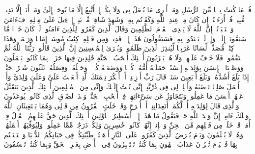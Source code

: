 \stopbuffer
\startbuffer[\q:46:9]
قُلۡ مَا كُنتُ بِدۡعࣰا مِّنَ ٱلرُّسُلِ وَمَاۤ أَدۡرِی مَا یُفۡعَلُ بِی وَلَا بِكُمۡۖ إِنۡ أَتَّبِعُ إِلَّا مَا یُوحَىٰۤ إِلَیَّ وَمَاۤ أَنَا۠ إِلَّا نَذِیرࣱ مُّبِینࣱ%
\stopbuffer
\startbuffer[\q:46:10]
قُلۡ أَرَءَیۡتُمۡ إِن كَانَ مِنۡ عِندِ ٱللَّهِ وَكَفَرۡتُم بِهِۦ وَشَهِدَ شَاهِدࣱ مِّنۢ بَنِیۤ إِسۡرَٰۤءِیلَ عَلَىٰ مِثۡلِهِۦ فَءَامَنَ وَٱسۡتَكۡبَرۡتُمۡۚ إِنَّ ٱللَّهَ لَا یَهۡدِی ٱلۡقَوۡمَ ٱلظَّٰلِمِینَ%
\stopbuffer
\startbuffer[\q:46:11]
وَقَالَ ٱلَّذِینَ كَفَرُوا۟ لِلَّذِینَ ءَامَنُوا۟ لَوۡ كَانَ خَیۡرࣰا مَّا سَبَقُونَاۤ إِلَیۡهِۚ وَإِذۡ لَمۡ یَهۡتَدُوا۟ بِهِۦ فَسَیَقُولُونَ هَٰذَاۤ إِفۡكࣱ قَدِیمࣱ%
\stopbuffer
\startbuffer[\q:46:12]
وَمِن قَبۡلِهِۦ كِتَٰبُ مُوسَىٰۤ إِمَامࣰا وَرَحۡمَةࣰۚ وَهَٰذَا كِتَٰبࣱ مُّصَدِّقࣱ لِّسَانًا عَرَبِیࣰّا لِّیُنذِرَ ٱلَّذِینَ ظَلَمُوا۟ وَبُشۡرَىٰ لِلۡمُحۡسِنِینَ%
\stopbuffer
\startbuffer[\q:46:13]
إِنَّ ٱلَّذِینَ قَالُوا۟ رَبُّنَا ٱللَّهُ ثُمَّ ٱسۡتَقَٰمُوا۟ فَلَا خَوۡفٌ عَلَیۡهِمۡ وَلَا هُمۡ یَحۡزَنُونَ%
\stopbuffer
\startbuffer[\q:46:14]
أُو۟لَٰۤئِكَ أَصۡحَٰبُ ٱلۡجَنَّةِ خَٰلِدِینَ فِیهَا جَزَاۤءَۢ بِمَا كَانُوا۟ یَعۡمَلُونَ%
\stopbuffer
\startbuffer[\q:46:15]
وَوَصَّیۡنَا ٱلۡإِنسَٰنَ بِوَٰلِدَیۡهِ إِحۡسَٰنًاۖ حَمَلَتۡهُ أُمُّهُۥ كُرۡهࣰا وَوَضَعَتۡهُ كُرۡهࣰاۖ وَحَمۡلُهُۥ وَفِصَٰلُهُۥ ثَلَٰثُونَ شَهۡرًاۚ حَتَّىٰۤ إِذَا بَلَغَ أَشُدَّهُۥ وَبَلَغَ أَرۡبَعِینَ سَنَةࣰ قَالَ رَبِّ أَوۡزِعۡنِیۤ أَنۡ أَشۡكُرَ نِعۡمَتَكَ ٱلَّتِیۤ أَنۡعَمۡتَ عَلَیَّ وَعَلَىٰ وَٰلِدَیَّ وَأَنۡ أَعۡمَلَ صَٰلِحࣰا تَرۡضَىٰهُ وَأَصۡلِحۡ لِی فِی ذُرِّیَّتِیۤۖ إِنِّی تُبۡتُ إِلَیۡكَ وَإِنِّی مِنَ ٱلۡمُسۡلِمِینَ%
\stopbuffer
\startbuffer[\q:46:16]
أُو۟لَٰۤئِكَ ٱلَّذِینَ نَتَقَبَّلُ عَنۡهُمۡ أَحۡسَنَ مَا عَمِلُوا۟ وَنَتَجَاوَزُ عَن سَیِّءَاتِهِمۡ فِیۤ أَصۡحَٰبِ ٱلۡجَنَّةِۖ وَعۡدَ ٱلصِّدۡقِ ٱلَّذِی كَانُوا۟ یُوعَدُونَ%
\stopbuffer
\startbuffer[\q:46:17]
وَٱلَّذِی قَالَ لِوَٰلِدَیۡهِ أُفࣲّ لَّكُمَاۤ أَتَعِدَانِنِیۤ أَنۡ أُخۡرَجَ وَقَدۡ خَلَتِ ٱلۡقُرُونُ مِن قَبۡلِی وَهُمَا یَسۡتَغِیثَانِ ٱللَّهَ وَیۡلَكَ ءَامِنۡ إِنَّ وَعۡدَ ٱللَّهِ حَقࣱّ فَیَقُولُ مَا هَٰذَاۤ إِلَّاۤ أَسَٰطِیرُ ٱلۡأَوَّلِینَ%
\stopbuffer
\startbuffer[\q:46:18]
أُو۟لَٰۤئِكَ ٱلَّذِینَ حَقَّ عَلَیۡهِمُ ٱلۡقَوۡلُ فِیۤ أُمَمࣲ قَدۡ خَلَتۡ مِن قَبۡلِهِم مِّنَ ٱلۡجِنِّ وَٱلۡإِنسِۖ إِنَّهُمۡ كَانُوا۟ خَٰسِرِینَ%
\stopbuffer
\startbuffer[\q:46:19]
وَلِكُلࣲّ دَرَجَٰتࣱ مِّمَّا عَمِلُوا۟ۖ وَلِیُوَفِّیَهُمۡ أَعۡمَٰلَهُمۡ وَهُمۡ لَا یُظۡلَمُونَ%
\stopbuffer
\startbuffer[\q:46:20]
وَیَوۡمَ یُعۡرَضُ ٱلَّذِینَ كَفَرُوا۟ عَلَى ٱلنَّارِ أَذۡهَبۡتُمۡ طَیِّبَٰتِكُمۡ فِی حَیَاتِكُمُ ٱلدُّنۡیَا وَٱسۡتَمۡتَعۡتُم بِهَا فَٱلۡیَوۡمَ تُجۡزَوۡنَ عَذَابَ ٱلۡهُونِ بِمَا كُنتُمۡ تَسۡتَكۡبِرُونَ فِی ٱلۡأَرۡضِ بِغَیۡرِ ٱلۡحَقِّ وَبِمَا كُنتُمۡ تَفۡسُقُونَ%
